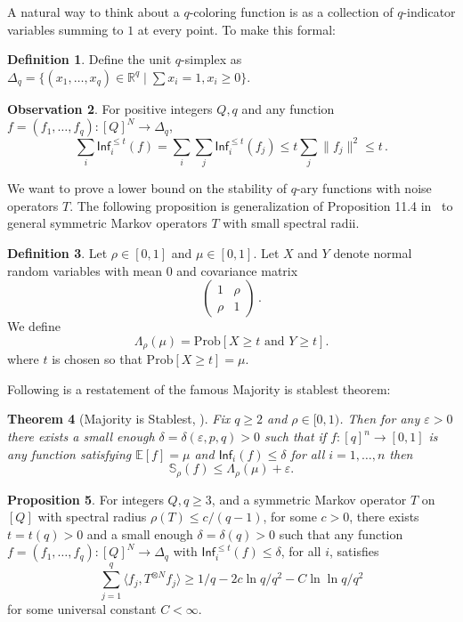 \documentclass[10pt]{article}
\newtheorem{theorem}{Theorem}[section]
\theoremstyle{definition}
\newtheorem{definition}[theorem]{Definition}
\newtheorem{proposition}[theorem]{Proposition}
\numberwithin{equation}{section}
\newcommand{\R}{{\mathbb R}}
\newtheorem{observation}[theorem]{Observation}
\newcommand{\infl}{\ensuremath{\mathsf{Inf}}}
\newcommand{\eps}{\varepsilon}
\renewcommand{\ge}{\geqslant}
\renewcommand{\le}{\leqslant}
\begin{document}
%
A natural way to think about a $q$-coloring function is as a
collection of $q$-indicator variables summing to $1$ at every point.
To make this formal:
%
\begin{definition}
  Define the unit $q$-simplex as $\Delta_q = \{(x_1,\ldots,x_{q}) \in
  \R^q \mid \sum x_i = 1, x_i \ge 0\}$.
\end{definition}
%
\begin{observation}\label{obs:infbndsimplex}
  For positive integers $Q,q$ and any function
  $f=(f_1,\ldots,f_q):[Q]^N\to \Delta_q$, \[\sum_i \infl^{\le t}_i(f) =
  \sum_i \sum_j \infl^{\le t}_i (f_j) \le t \sum_j \|f_j\|^2 \le t\,.\]
\end{observation}
%
%
We want to prove a lower bound on the stability of $q$-ary functions
with noise operators $T$. The following proposition is generalization
of Proposition 11.4 in~\cite{KKMO} to general symmetric Markov
operators $T$ with small spectral radii.
%
%
\begin{definition}
  \label{def:gamma-rho}
  Let $\rho\in[0,1]$ and $\mu\in[0,1]$. Let $X$ and $Y$ denote
normal random variables with mean $0$ and covariance matrix 
\[
\begin{pmatrix}
  1 & \rho \\ \rho & 1
\end{pmatrix}\,.
\]
We define
\[
\Lambda_{\rho}(\mu) = \mathrm{Prob}\left[X\ge t\mbox{ and }Y\ge
  t\right].
\]
where $t$ is chosen so that $\mathrm{Prob}[X\ge t] = \mu$.
\end{definition}
Following is a restatement of the famous Majority is stablest theorem:
\begin{theorem}[Majority is Stablest, \cite{KKMO}]
  Fix $q\ge 2$ and $\rho\in[0,1)$. Then for any $\eps>0$ there exists
  a small enough $\delta=\delta(\eps,p,q)>0$ such that if
  $f:[q]^n\to[0,1]$ is any function satisfying $\mathbb{E}[f] = \mu$
  and $\infl_i(f)\le \delta$ for all $i=1,\ldots,n$ then
\[
\mathbb{S}_{\rho}(f)\le \Lambda_{\rho}(\mu)+\eps.
\]
\end{theorem}
\begin{proposition}
\label{prop:stab}
For integers $Q,q \ge 3$, and a symmetric Markov operator $T$ on $[Q]$
with spectral radius $\rho(T)\le {c}/{(q-1)}$, for some $c>0$, there
exists $t=t(q)>0$ and a small enough $\delta=\delta(q)>0$ such
that %
any function $f=(f_1,\ldots,f_q):[Q]^N\rightarrow \Delta_q$ with
$\infl_i^{\le t} (f)\le \delta$, for all $i$, satisfies
  \[ \sum_{j=1}^q 
\langle f_j, T^{\otimes N} f_j\rangle 
%
\ge 1/q - 2 c \ln q/q^2 - C
  \ln\ln q /q^2\] for some universal constant $C<\infty$.
\end{proposition}
\end{document}
